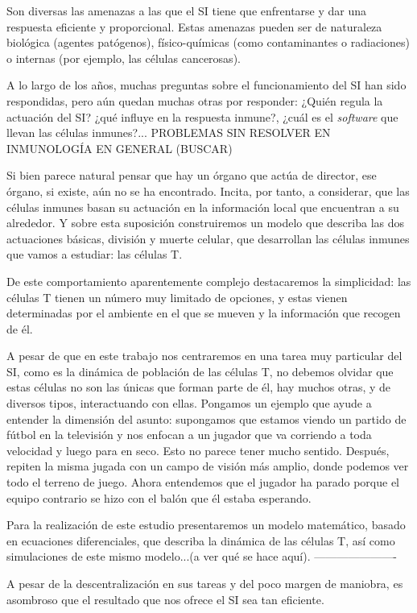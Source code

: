 Son diversas las amenazas a las que el SI tiene que enfrentarse y dar una respuesta eficiente y proporcional. Estas amenazas pueden ser de naturaleza biológica (agentes patógenos), físico-químicas (como contaminantes o radiaciones) o internas (por ejemplo, las células cancerosas).

A lo largo de los años, muchas preguntas sobre el funcionamiento del SI han sido respondidas, pero aún quedan muchas otras por responder: ¿Quién regula la actuación del SI? ¿qué influye en la respuesta inmune?, ¿cuál es el \textit{software} que llevan las células inmunes?... PROBLEMAS SIN RESOLVER EN INMUNOLOGÍA EN GENERAL (BUSCAR)

Si bien parece natural pensar que hay un órgano que actúa de director, ese
órgano, si existe, aún no se ha encontrado. Incita, por tanto, a considerar, que las
células inmunes basan su actuación en la información local que encuentran a su
alrededor. Y sobre esta suposición construiremos un modelo que describa las
dos actuaciones básicas, división y muerte celular, que desarrollan las células inmunes que vamos a estudiar: las células T.

De este comportamiento aparentemente complejo destacaremos la simplicidad: las células T tienen un número muy limitado de opciones, y estas vienen determinadas por el ambiente en el que se mueven y la información que recogen de él.


A pesar de que en este trabajo nos centraremos en una tarea muy particular del SI, como es la dinámica de población de las células T, no debemos olvidar que estas células no son las únicas que forman parte de él, hay muchos otras, y de diversos tipos, interactuando con ellas. Pongamos un ejemplo que ayude a entender la dimensión del asunto: supongamos que estamos viendo un partido de fútbol en la televisión y nos enfocan a un jugador que va corriendo a toda velocidad y luego para en seco. Esto no parece tener mucho sentido. Después, repiten la misma jugada con un campo de visión más amplio, donde podemos ver todo el terreno de juego. Ahora entendemos que el jugador ha parado porque el equipo contrario se hizo con el balón que él estaba esperando. 

Para la realización de este estudio presentaremos un modelo matemático, basado en ecuaciones diferenciales, que describa la dinámica de las células T, así como simulaciones de este mismo modelo...(a ver qué se hace aquí).
----------------------

A pesar de la descentralización en sus tareas y del poco margen de maniobra, es asombroso que el resultado que nos ofrece el SI sea tan eficiente.

